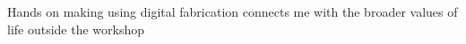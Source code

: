Hands on making using digital fabrication connects me with the broader values of life outside the workshop